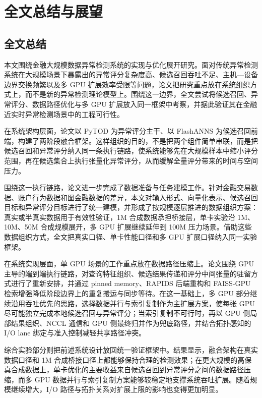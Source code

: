 
\chapter{全文总结与展望}

\section{全文总结}

本文围绕金融大规模数据异常检测系统的实现与优化展开研究。面对传统异常检测系统在大规模场景下暴露出的异常评分复杂度高、候选召回吞吐不足、主机---设备边界交换频繁以及多 GPU 扩展效率受限等问题，论文把研究重点放在系统组织方式上，而不是新的异常检测理论模型上。围绕这一边界，全文尝试将候选召回、异常评分、数据路径优化与多 GPU 扩展放入同一框架中考察，并据此验证其在金融近实时异常检测场景中的工程可行性。

在系统架构层面，论文以 PyTOD 为异常评分主干、以 FlashANNS 为候选召回前端，构建了两阶段融合框架。这样组织的目的，不是把两个组件简单串联，而是把候选召回和异常评分纳入同一条执行链路，使系统能够先在大规模样本中缩小评分范围，再在候选集合上执行张量化异常评分，从而缓解全量评分带来的时间与空间压力。

围绕这一执行链路，论文进一步完成了数据准备与任务建模工作。针对金融交易数据、账户行为数据和图金融数据的差异，本文对输入形式、向量化表示、候选召回目标和异常评分目标进行了统一建模，并形成了按规模逐层推进的数据组织方案：真实或半真实数据用于有效性验证，1M 合成数据承担桥接层，单卡实验沿 1M、10M、50M 合成规模展开，多 GPU 扩展继续延伸到 100M 压力场景。借助这些数据组织方式，全文把真实口径、单卡性能口径和多 GPU 扩展口径纳入同一实验框架。

在系统实现层面，单 GPU 场景的工作重点放在数据路径压缩上。论文围绕 GPU 主导的端到端执行链路，对查询特征组织、候选结果传递和评分中间张量的驻留方式进行了重新安排，并通过 pinned memory、RAPIDS 后端重构和 FAISS-GPU 检索增强降低阶段边界上的重复搬运与同步等待。在这一基础上，多 GPU 部分继续沿用吞吐优先的思路，选择数据并行与索引复制作为主扩展方案，使每张 GPU 尽可能独立完成本地候选召回与异常评分；当索引复制不可行时，再以 GPU 侧局部结果组织、NCCL 通信和 GPU 侧最终归并作为兜底路径，并结合拓扑感知的 I/O lane 绑定与准入控制减轻共享路径冲突。

综合实验部分则把前述系统设计放回统一验证框架中。结果显示，融合架构在真实数据口径和 1M 合成桥接口径上都能够保持合理的检测效果；在更大规模的高保真合成数据上，单卡优化的主要收益来自候选召回到异常评分之间的数据路径压缩，而多 GPU 数据并行与索引复制方案能够较稳定地支撑系统吞吐扩展。随着规模继续增大，I/O 路径与拓扑关系对扩展上限的影响也变得更加明显。

